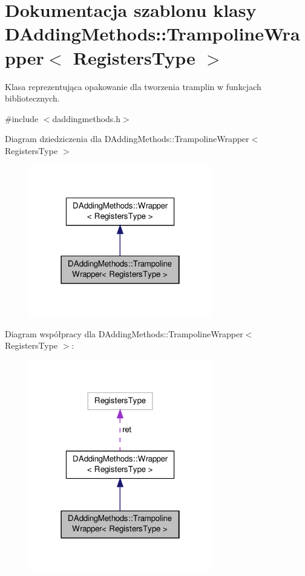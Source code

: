 \hypertarget{class_d_adding_methods_1_1_trampoline_wrapper}{\section{Dokumentacja szablonu klasy D\-Adding\-Methods\-:\-:Trampoline\-Wrapper$<$ Registers\-Type $>$}
\label{class_d_adding_methods_1_1_trampoline_wrapper}
}


Klasa reprezentująca opakowanie dla tworzenia tramplin w funkcjach bibliotecznych.  




{\ttfamily \#include $<$daddingmethods.\-h$>$}



Diagram dziedziczenia dla D\-Adding\-Methods\-:\-:Trampoline\-Wrapper$<$ Registers\-Type $>$\nopagebreak
\begin{figure}[H]
\begin{center}
\leavevmode
\includegraphics[width=226pt]{class_d_adding_methods_1_1_trampoline_wrapper__inherit__graph}
\end{center}
\end{figure}


Diagram współpracy dla D\-Adding\-Methods\-:\-:Trampoline\-Wrapper$<$ Registers\-Type $>$\-:\nopagebreak
\begin{figure}[H]
\begin{center}
\leavevmode
\includegraphics[width=226pt]{class_d_adding_methods_1_1_trampoline_wrapper__coll__graph}
\end{center}
\end{figure}

